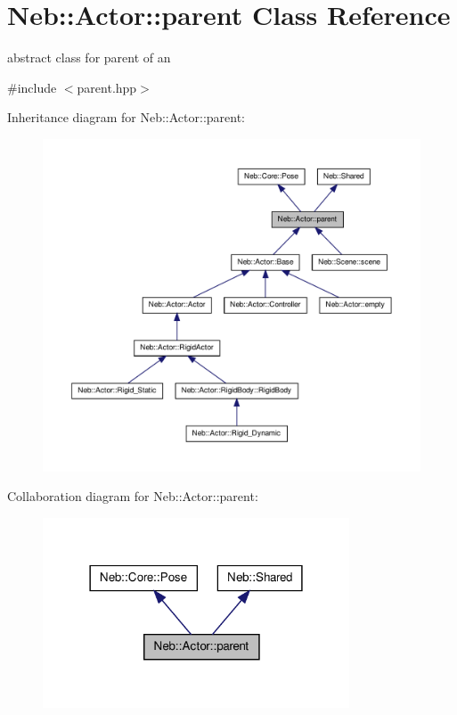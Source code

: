 \hypertarget{classNeb_1_1Actor_1_1parent}{\section{\-Neb\-:\-:\-Actor\-:\-:parent \-Class \-Reference}
\label{classNeb_1_1Actor_1_1parent}
}


abstract class for parent of an   




{\ttfamily \#include $<$parent.\-hpp$>$}



\-Inheritance diagram for \-Neb\-:\-:\-Actor\-:\-:parent\-:
\nopagebreak
\begin{figure}[H]
\begin{center}
\leavevmode
\includegraphics[width=350pt]{classNeb_1_1Actor_1_1parent__inherit__graph}
\end{center}
\end{figure}


\-Collaboration diagram for \-Neb\-:\-:\-Actor\-:\-:parent\-:
\nopagebreak
\begin{figure}[H]
\begin{center}
\leavevmode
\includegraphics[width=258pt]{classNeb_1_1Actor_1_1parent__coll__graph}
\end{center}
\end{figure}
